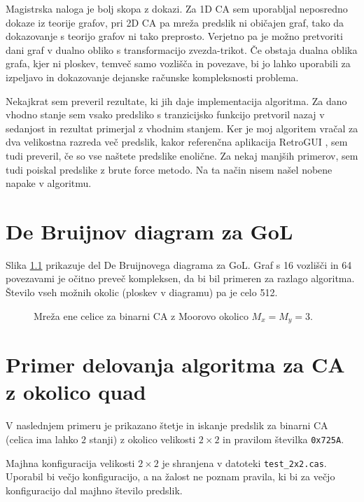 \documentclass[12pt,a4paper,openany,twoside]{book}
\begin{document}
Magistrska naloga je bolj skopa z dokazi.
Za 1D CA sem uporabljal neposredno dokaze iz teorije grafov,
pri 2D CA pa mreža predslik ni običajen graf,
tako da dokazovanje s teorijo grafov ni tako preprosto.
Verjetno pa je možno pretvoriti dani graf v dualno obliko s transformacijo zvezda-trikot.
Če obstaja dualna oblika grafa, kjer ni ploskev, temveč samo vozlišča in povezave,
bi jo lahko uporabili za izpeljavo in dokazovanje dejanske računske kompleksnosti problema.

Nekajkrat sem preveril rezultate, ki jih daje implementacija algoritma.
Za dano vhodno stanje sem vsako predsliko s tranzicijsko funkcijo
pretvoril nazaj v sedanjost in rezultat primerjal z vhodnim stanjem.
Ker je moj algoritem vračal za dva velikostna razreda več predslik,
kakor referenčna aplikacija RetroGUI \cite{Bickford2012},
sem tudi preveril, če so vse naštete predslike enolične.
Za nekaj manjših primerov, sem tudi poiskal predslike z brute force metodo.
Na ta način nisem našel nobene napake v algoritmu.


\appendix

\chapter{De Bruijnov diagram za GoL}

Slika \ref{network_single_moore} prikazuje del De Bruijnovega diagrama za GoL.
Graf s 16 vozlišči in 64 povezavami je očitno preveč kompleksen, da bi bil primeren za razlago algoritma.
Število vseh možnih okolic (ploskev v diagramu) pa je celo 512.

\begin{figure}[htb]
\centerline{}
\caption[Mreža ene celice za GoL.]{Mreža ene celice za binarni CA z Moorovo okolico \(M_x=M_y=3\).}
\label{network_single_moore}
\end{figure}

\chapter{Primer delovanja algoritma za CA z okolico quad}

V naslednjem primeru je prikazano štetje in iskanje predslik
za binarni CA (celica ima lahko \(2\) stanji) z okolico velikosti \(2 \times 2\)
in pravilom številka \verb|0x725A|.

Majhna konfiguracija velikosti \(2 \times 2\) je shranjena v datoteki \verb|test_2x2.cas|.
Uporabil bi večjo konfiguracijo, a na žalost ne poznam pravila,
ki bi za večjo konfiguracijo dal majhno število predslik.
\end{document}
